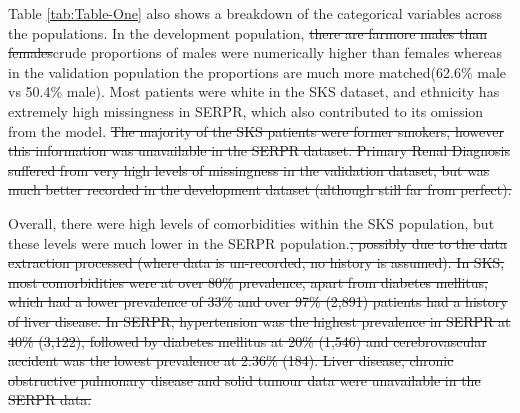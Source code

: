 \documentclass[
]{article}
\begin{document}
Table \ref{tab:Table-One} also shows a breakdown of the categorical variables across the populations. In the development population, \sout{there are farmore males than females}crude proportions of males were numerically higher than females whereas in the validation population the proportions are much more matched(62.6\% male vs 50.4\% male). Most patients were white in the SKS dataset, and ethnicity has extremely high missingness in SERPR, which also contributed to its omission from the model. \sout{The majority of the SKS patients were former smokers, however this information was unavailable in the SERPR dataset. Primary Renal Diagnosis suffered from very high levels of missingness in the validation dataset, but was much better recorded in the development dataset (although still far from perfect).}

Overall, there were high levels of comorbidities within the SKS population, but these levels were much lower in the SERPR population.\sout{, possibly due to the data extraction processed (where data is un-recorded, no history is assumed). In SKS, most comorbidities were at over 80\% prevalence, apart from diabetes mellitus, which had a lower prevalence of 33\% and over 97\% (2,891) patients had a history of liver disease. In SERPR, hypertension was the highest prevalence in SERPR at 40\% (3,122), followed by diabetes mellitus at 20\% (1,546) and cerebrovascular accident was the lowest prevalence at 2.36\% (184). Liver disease, chronic obstructive pulmonary disease and solid tumour data were unavailable in the SERPR data.}
\end{document}
